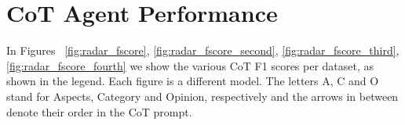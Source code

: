 \documentclass[11pt]{article}
\begin{document}









\section{CoT Agent Performance}
\label{sec:appendix:cot_agent_performance}

In Figures ~\ref{fig:radar_fscore}, \ref{fig:radar_fscore_second}, \ref{fig:radar_fscore_third}, \ref{fig:radar_fscore_fourth} we show the various CoT F1 scores per dataset, as shown in the legend. Each figure is a different model. The letters A, C and O stand for Aspects, Category and Opinion, respectively and the arrows in between denote their order in the CoT prompt.
\end{document}
